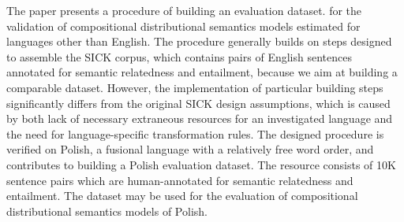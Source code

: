 The paper presents a procedure of building an evaluation dataset. for the validation of compositional distributional semantics models estimated for languages other than English. The procedure generally builds on steps designed to assemble the SICK corpus, which contains pairs of English sentences annotated for semantic relatedness and entailment, because we aim at building a comparable dataset. However, the implementation of particular building steps significantly differs from the original SICK design assumptions, which is caused by both lack of necessary extraneous resources for an investigated language and the need for language-specific transformation rules. The designed procedure is verified on Polish, a fusional language with a relatively free word order, and contributes to building a Polish evaluation dataset. The resource consists of 10K sentence pairs which are human-annotated for semantic relatedness and entailment. The dataset may be used for the evaluation of compositional distributional semantics models of Polish.
